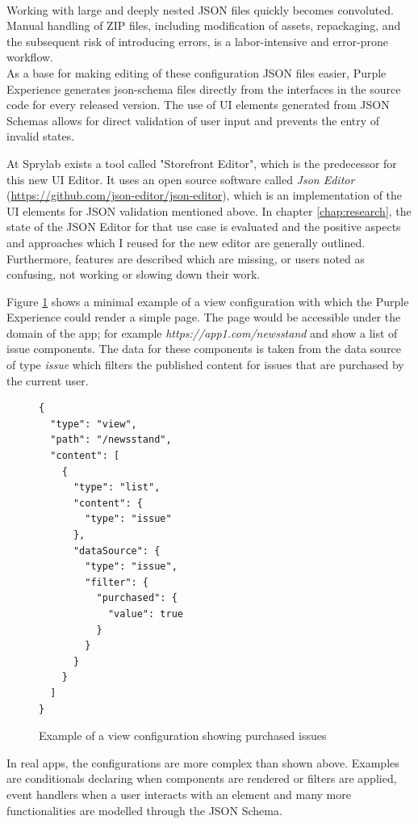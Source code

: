 \\
Working with large and deeply nested JSON files quickly becomes convoluted.
Manual handling of ZIP files, including modification of assets, repackaging, and the subsequent risk of introducing errors, is a labor-intensive and error-prone workflow.
\\
As a base for making editing of these configuration JSON files easier, Purple Experience generates \Gls{json-schema} files directly from the interfaces in the source code for every released version.
The use of UI elements generated from JSON Schemas allows for direct validation of user input and prevents the entry of invalid states.

At Sprylab exists a tool called "Storefront Editor", which is the predecessor for this new UI Editor.
It uses an open source software called \textit{Json Editor} (\url{https://github.com/json-editor/json-editor}), which is an implementation of the UI elements for JSON validation mentioned above.
In chapter \ref{chap:research}, the state of the JSON Editor for that use case is evaluated and the positive aspects and approaches which I reused for the new editor are generally outlined.
Furthermore, features are described which are missing, or users noted as confusing, not working or slowing down their work.


Figure \ref{fig:viewexample} shows a minimal example of a view configuration with which the Purple Experience could render a simple page.
The page would be accessible under the domain of the app; for example \textit{https://app1.com/newsstand} and show a list of issue components.
The data for these components is taken from the data source of type \textit{issue} which filters the published content for issues that are purchased by the current user. 
\begin{figure}[h!]
  \lstset{language=json,basicstyle=\footnotesize\ttfamily,numbers=left,showstringspaces=false,frame=single}
  \begin{lstlisting}
{
  "type": "view",
  "path": "/newsstand",
  "content": [
    {
      "type": "list",
      "content": {
        "type": "issue"
      },
      "dataSource": {
        "type": "issue",
        "filter": {
          "purchased": {
            "value": true
          }
        }
      }
    }
  ]
}
  \end{lstlisting}
  \caption{Example of a view configuration showing purchased issues}
  \label{fig:viewexample}
\end{figure}

In real apps, the configurations are more complex than shown above. Examples are conditionals declaring when components are rendered or filters are applied, event handlers when a user interacts with an element and many more functionalities are modelled through the JSON Schema.


